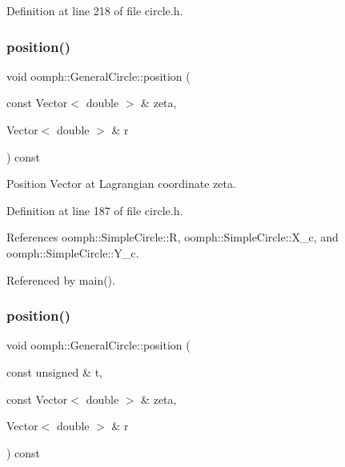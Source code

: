 Definition at line 218 of file circle.\+h.

\mbox{\label{classoomph_1_1GeneralCircle_acc120835b4f0c69e7dce7e839db63d1d}} 
\subsubsection{\texorpdfstring{position()}{position()}\hspace{0.1cm}{\footnotesize\ttfamily [1/2]}}
{\footnotesize\ttfamily void oomph\+::\+General\+Circle\+::position (\begin{DoxyParamCaption}\item[{const Vector$<$ double $>$ \&}]{zeta,  }\item[{Vector$<$ double $>$ \&}]{r }\end{DoxyParamCaption}) const\hspace{0.3cm}{\ttfamily [inline]}}



Position Vector at Lagrangian coordinate zeta. 



Definition at line 187 of file circle.\+h.



References oomph\+::\+Simple\+Circle\+::R, oomph\+::\+Simple\+Circle\+::\+X\+\_\+c, and oomph\+::\+Simple\+Circle\+::\+Y\+\_\+c.



Referenced by main().

\mbox{\label{classoomph_1_1GeneralCircle_a94f7f58a7131f80a245007ff0da73f74}} 
\subsubsection{\texorpdfstring{position()}{position()}\hspace{0.1cm}{\footnotesize\ttfamily [2/2]}}
{\footnotesize\ttfamily void oomph\+::\+General\+Circle\+::position (\begin{DoxyParamCaption}\item[{const unsigned \&}]{t,  }\item[{const Vector$<$ double $>$ \&}]{zeta,  }\item[{Vector$<$ double $>$ \&}]{r }\end{DoxyParamCaption}) const\hspace{0.3cm}{\ttfamily [inline]}}



